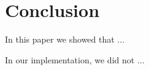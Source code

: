 \section{Conclusion}
\label{sec:conclusion}
In this paper we showed that ...

In our implementation, we did not ...
